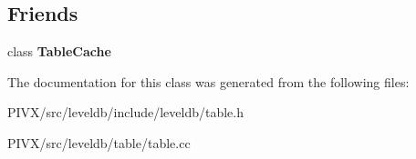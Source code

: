 \subsection*{Friends}
\begin{DoxyCompactItemize}
\item 
\mbox{\label{classleveldb_1_1_table_ae1e5f7bae4682672cfcc68d0add43199}} 
class {\bfseries Table\+Cache}
\end{DoxyCompactItemize}


The documentation for this class was generated from the following files\+:\begin{DoxyCompactItemize}
\item 
P\+I\+V\+X/src/leveldb/include/leveldb/table.\+h\item 
P\+I\+V\+X/src/leveldb/table/table.\+cc\end{DoxyCompactItemize}

